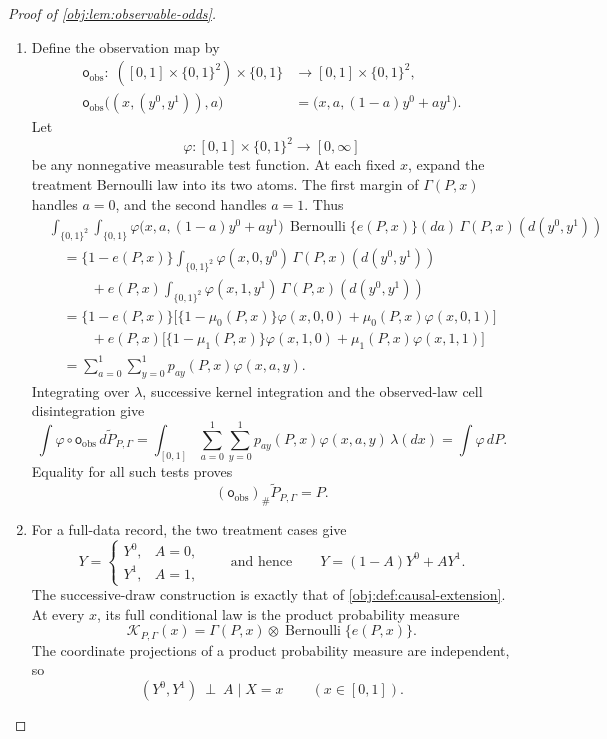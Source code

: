 \begin{proof}[Proof of \cref{obj:lem:observable-odds}]
\begin{enumerate}
\item Define the observation map by
\[
\begin{aligned}
\mathsf o_{\mathrm{obs}}:\;
([0,1]\times\{0,1\}^2)\times\{0,1\}
&\longrightarrow[0,1]\times\{0,1\}^2,\\
\mathsf o_{\mathrm{obs}}\bigl((x,(y^0,y^1)),a\bigr)
&=\bigl(x,a,(1-a)y^0+ay^1\bigr).
\end{aligned}
\]
Let
\[
\varphi:[0,1]\times\{0,1\}^2\longrightarrow[0,\infty]
\]
be any nonnegative measurable test function. At each fixed \(x\), expand the treatment Bernoulli law into its two atoms. The first margin of \(\Gamma(P,x)\) handles \(a=0\), and the second handles \(a=1\). Thus
\[
\begin{aligned}
&\int_{\{0,1\}^2}\int_{\{0,1\}}
 \varphi\bigl(x,a,(1-a)y^0+ay^1\bigr)\,
 \operatorname{Bernoulli}\{e(P,x)\}(da)\,
 \Gamma(P,x)(d(y^0,y^1))\\
&\quad=\{1-e(P,x)\}\int_{\{0,1\}^2}
 \varphi(x,0,y^0)\,\Gamma(P,x)(d(y^0,y^1))\\
&\qquad\quad
 +e(P,x)\int_{\{0,1\}^2}
 \varphi(x,1,y^1)\,\Gamma(P,x)(d(y^0,y^1))\\
&\quad=\{1-e(P,x)\}
 \bigl[\{1-\mu_0(P,x)\}\varphi(x,0,0)
       +\mu_0(P,x)\varphi(x,0,1)\bigr]\\
&\qquad\quad
 +e(P,x)
 \bigl[\{1-\mu_1(P,x)\}\varphi(x,1,0)
       +\mu_1(P,x)\varphi(x,1,1)\bigr]\\
&\quad=\sum_{a=0}^1\sum_{y=0}^1p_{ay}(P,x)\varphi(x,a,y).
\end{aligned}
\]
Integrating over \(\lambda\), successive kernel integration and the observed-law cell disintegration give
\[
\int\varphi\circ\mathsf o_{\mathrm{obs}}\,
 d\widetilde P_{P,\Gamma}
=
\int_{[0,1]}\sum_{a=0}^1\sum_{y=0}^1
 p_{ay}(P,x)\varphi(x,a,y)\,\lambda(dx)
=
\int\varphi\,dP.
\]
Equality for all such tests proves
\[
(\mathsf o_{\mathrm{obs}})_\#\widetilde P_{P,\Gamma}=P.
\]

\item For a full-data record, the two treatment cases give
\[
Y=
\begin{cases}
Y^0,&A=0,\\
Y^1,&A=1,
\end{cases}
\qquad\text{and hence}\qquad
Y=(1-A)Y^0+AY^1.
\]
The successive-draw construction is exactly that of \cref{obj:def:causal-extension}. At every \(x\), its full conditional law is the product probability measure
\[
\mathcal K_{P,\Gamma}(x)
=\Gamma(P,x)\otimes\operatorname{Bernoulli}\{e(P,x)\}.
\]
The coordinate projections of a product probability measure are independent, so
\[
(Y^0,Y^1)\ \perp\ A\mid X=x
\qquad(x\in[0,1]).
\]


\end{enumerate}
\end{proof}
